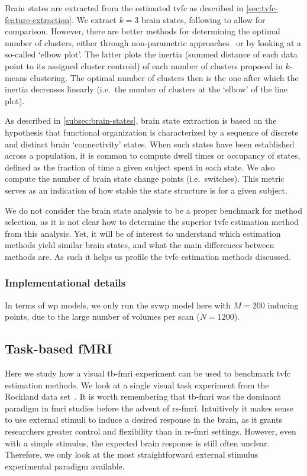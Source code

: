 Brain states are extracted from the estimated \gls{tvfc} as described in \cref{sec:tvfc-feature-extraction}.
We extract $k = 3$ brain states, following \textcite{Choe2017} to allow for comparison.
However, there are better methods for determining the optimal number of clusters, either through non-parametric approaches~\parencite[see e.g.][]{Nielsen2017, Taghia2017} or by looking at a so-called `elbow plot'.
The latter plots the inertia (summed distance of each data point to its assigned cluster centroid) of each number of clusters proposed in $k$-means clustering.
The optimal number of clusters then is the one after which the inertia decreases linearly (i.e.~the number of clusters at the `elbow' of the line plot).

As described in \cref{subsec:brain-states}, brain state extraction is based on the hypothesis that functional organization is characterized by a sequence of discrete and distinct brain `connectivity' states.
When such states have been established across a population, it is common to compute dwell times or occupancy of states, defined as the fraction of time a given subject spent in each state.
We also compute the number of brain state change points (i.e.~switches).
This metric serves as an indication of how stable the state structure is for a given subject.

We do not consider the brain state analysis to be a proper benchmark for method selection, as it is not clear how to determine the superior \gls{tvfc} estimation method from this analysis.
Yet, it will be of interest to understand which estimation methods yield similar brain states, and what the main differences between methods are.
As such it helps us profile the \gls{tvfc} estimation methods discussed.

\subsubsection{Implementational details}

In terms of \gls{wp} models, we only run the \gls{svwp} model here with $M = 200$ inducing points, due to the large number of volumes per scan ($N = 1200$).

\subsection{Task-based fMRI}
\label{subsec:rockland-methodology}

Here we study how a visual \gls{tb-fmri} experiment can be used to benchmark \gls{tvfc} estimation methods.
We look at a single visual task experiment from the Rockland data set~\parencite{Nooner2012}.
%
It is worth remembering that \gls{tb-fmri} was the dominant paradigm in \gls{fmri} studies before the advent of \gls{rs-fmri}.
Intuitively it makes sense to use external stimuli to induce a desired response in the brain, as it grants researchers greater control and flexibility than in \gls{rs-fmri} settings.
However, even with a simple stimulus, the expected brain response is still often unclear.
Therefore, we only look at the most straightforward external stimulus experimental paradigm available.

